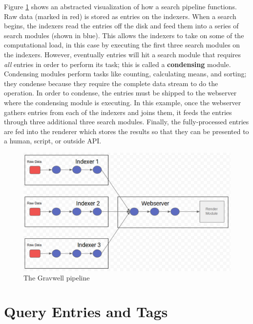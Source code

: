 Figure \ref{fig:pipeline} shows an abstracted visualization of how a search
pipeline functions. Raw data (marked in red) is stored as entries on the indexers. When a
search begins, the indexers read the entries off the disk and feed them
into a series of search modules (shown in blue). This allows the
indexers to take on some of the computational load, in this case by
executing the first three search modules on the indexers. However,
eventually entries will hit a search module that requires
\emph{all} entries in order to perform its task; this is called a
\textbf{condensing} module. Condensing modules perform tasks like counting,
calculating means, and sorting; they condense because they require the
complete data stream to do the operation. In order to condense, the
entries must be shipped to the webserver where the condensing module is
executing. In this example, once the webserver gathers entries from
each of the indexers and joins them, it feeds the entries through three
additional three search modules. Finally, the fully-processed entries
are fed into the renderer which stores the results so that they can be
presented to a human, script, or outside API.

\begin{figure}
	\includegraphics{images/pipeline.png}
	\caption{The Gravwell pipeline}
	\label{fig:pipeline}
\end{figure}




\section{Query Entries and Tags}

